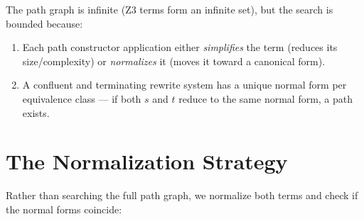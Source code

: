\documentclass[11pt,a4paper]{report}
\theoremstyle{definition}
\theoremstyle{plain}
\begin{document}
The path graph is infinite (Z3 terms form an infinite set), but
the search is bounded because:
\begin{enumerate}
  \item Each path constructor application either \emph{simplifies}
    the term (reduces its size/complexity) or \emph{normalizes} it
    (moves it toward a canonical form).
  \item A confluent and terminating rewrite system has a unique
    normal form per equivalence class --- if both $s$ and $t$ reduce
    to the same normal form, a path exists.
\end{enumerate}

\section{The Normalization Strategy}

Rather than searching the full path graph, we normalize both terms
and check if the normal forms coincide:
\end{document}
